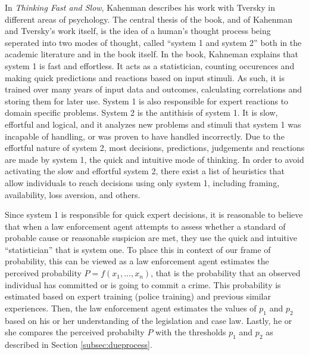 \documentclass[12pt]{article} %
\begin{document}
In \textit{Thinking Fast and Slow}, Kahenman describes his work with Tversky in different areas of psychology. The central thesis of the book, and of Kahenman and Tversky's work itself, is the idea of a human's thought process being seperated into two modes of thought, called ``system 1 and system 2'' both in the academic literature and in the book itself. In the book, Kahneman explains that system 1 is fast and effortless. It acts as a statistician, counting occurences and making quick predictions and reactions based on input stimuli. As such, it is trained over many years of input data and outcomes, calculating correlations and storing them for later use. System 1 is also responsible for expert reactions to domain specific problems. System 2 is the antithisis of system 1. It is slow, effortful and logical, and it analyzes new problems and stimuli that system 1 was incapable of handling, or was proven to have handled incorrectly. Due to the effortful nature of system 2, most decisions, predictions, judgements and reactions are made by system 1, the quick and intuitive mode of thinking. In order to avoid activating the slow and effortful system 2, there exist a list of heuristics that allow individuals to reach decisions using only system 1, including framing, availability, loss aversion, and others.

Since system 1 is responsible for quick expert decisions, it is reasonable to believe that when a law enforcement agent attempts to assess whether a standard of probable cause or reasonable suspicion are met, they use the quick and intuitive ``statistician'' that is system one. To place this in context of our frame of probability, this can be viewed as a law enforcement agent estimates the perceived probability $P = f(x_1,...,x_n)$, that is the probability that an observed individual has committed or is going to commit a crime. This probability is estimated based on expert training (police training) and previous similar experiences. Then, the law enforcement agent estimates the values of $p_1$ and $p_2$ based on his or her understanding of the legislation and case law. Lastly, he or she compares the perceived probabilty $P$ with the thresholds $p_1$ and $p_2$ as described in Section \ref{subsec:dueprocess}.


\end{document}
